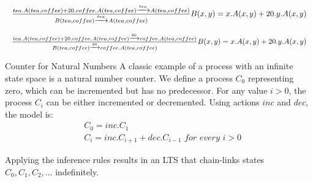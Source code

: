 \[
\resizebox{\linewidth}{!}{$
    \frac{tea.A(tea,coffee)+20.coffee.A(tea,coffee)\xrightarrow{tea}A(tea,coffee)}{B(tea,coffee)\xrightarrow{tea}A(tea,coffee)}
    B(x,y)=x.A(x,y)+20.y.A(x,y)
$}
\]

\[
\resizebox{\linewidth}{!}{$
    \frac{tea.A(tea,coffee)+20.coffee.A(tea,coffee)\xrightarrow{20}coffee.A(tea,coffee)}{B(tea,coffee)\xrightarrow{20}coffee.A(tea,coffee)}
    B(x,y)=x.A(x,y)+20.y.A(x,y)
$}
\]

\begin{Example}{Counter for Natural Numbers}{}
A classic example of a process with an infinite state space is a natural number counter. We define a process $C_0$ representing zero, which can be incremented but has no predecessor. For any value $i>0$, the process $C_i$ can be either incremented or decremented. Using actions $inc$ and $dec$, the model is:
\begin{align*}
    &C_0=inc.C_1\\
    &C_i=inc.C_{i+1}+dec.C_{i-1}\textit{ for every }i>0
\end{align*}

Applying the inference rules results in an LTS that chain-links states $C_0,C_1,C_2,\ldots$ indefinitely.
\end{Example}

